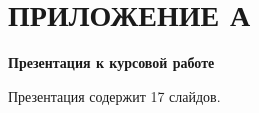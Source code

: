\chapter*{ПРИЛОЖЕНИЕ А}
\begin{center}
	\textbf{Презентация к курсовой работе}
\end{center}

Презентация содержит 17 слайдов.